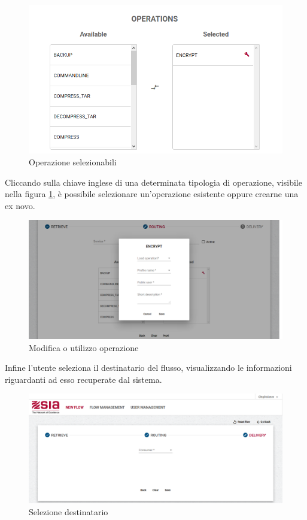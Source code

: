 \begin{figure}
\begin{center}
\includegraphics[width=0.6\columnwidth]{images/ope.png}
\end{center}
\caption{Operazione selezionabili}
\label{fig:ope}
\end{figure}

Cliccando sulla chiave inglese di una determinata tipologia di operazione, visibile nella figura \ref{fig:ope}, è possibile selezionare un'operazione esistente oppure crearne una ex novo.


\begin{figure}
\begin{center}
\includegraphics[width=1.0\columnwidth]{images/ope1.png}
\end{center}
\caption{Modifica o utilizzo operazione}
\label{fig:ope1}
\end{figure}

Infine l'utente seleziona il destinatario del flusso, visualizzando le informazioni riguardanti ad esso recuperate dal sistema.

\begin{figure}
\begin{center}
\includegraphics[width=1.0\columnwidth]{images/delive.png}
\end{center}
\caption{Selezione destinatario}
\label{fig:deli}
\end{figure}


